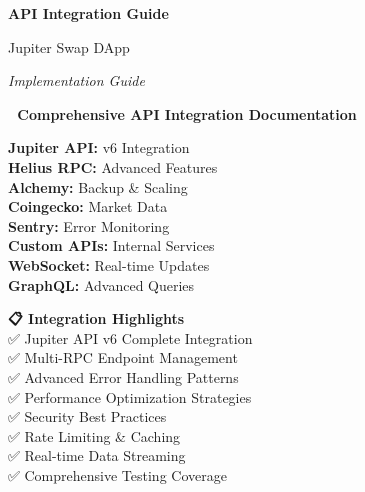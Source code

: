 \documentclass[11pt,a4paper]{article}
\begin{document}
\begin{titlepage}
    \centering
    \vspace*{1cm}
    
    {\Huge\textbf{\textcolor{jupiterBlue}{API Integration Guide}}\par}
    \vspace{0.5cm}
    {\LARGE\textcolor{deauraPurple}{Jupiter Swap DApp}\par}
    \vspace{0.3cm}
    {\Large\textit{Implementation Guide}\par}
    
    \vspace{1.5cm}
    
    \begin{tcolorbox}[colback=jupiterBlue!10,colframe=jupiterBlue,width=0.9\textwidth]
        \centering
        \textbf{🔌 Comprehensive API Integration Documentation}\\
        \vspace{0.5cm}
        \begin{multicols}{2}
        \textbf{Jupiter API:} v6 Integration\\
        \textbf{Helius RPC:} Advanced Features\\
        \textbf{Alchemy:} Backup \& Scaling\\
        \textbf{Coingecko:} Market Data\\
        \textbf{Sentry:} Error Monitoring\\
        \textbf{Custom APIs:} Internal Services\\
        \textbf{WebSocket:} Real-time Updates\\
        \textbf{GraphQL:} Advanced Queries
        \end{multicols}
    \end{tcolorbox}
    
    \vspace{1.5cm}
    
    \begin{tcolorbox}[colback=solanaGreen!10,colframe=solanaGreen,width=0.8\textwidth]
        \centering
        \textbf{📋 Integration Highlights}\\
        \vspace{0.3cm}
        ✅ Jupiter API v6 Complete Integration\\
        ✅ Multi-RPC Endpoint Management\\
        ✅ Advanced Error Handling Patterns\\
        ✅ Performance Optimization Strategies\\
        ✅ Security Best Practices\\
        ✅ Rate Limiting \& Caching\\
        ✅ Real-time Data Streaming\\
        ✅ Comprehensive Testing Coverage
    \end{tcolorbox}
    

\end{titlepage}
\end{document}
